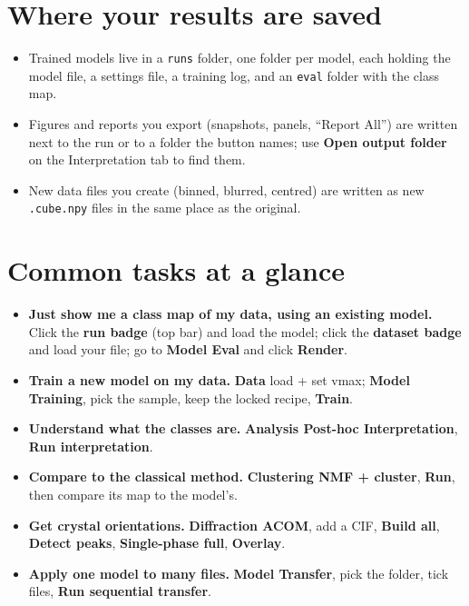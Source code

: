 \documentclass[11pt]{article}
\newcommand{\btn}[1]{\textbf{#1}}
\newcommand{\tab}[1]{\textsf{\textbf{#1}}}
\begin{document}
\section{Where your results are saved}
\begin{itemize}[itemsep=2pt]
\item Trained models live in a \texttt{runs} folder, one folder per model, each
holding the model file, a settings file, a training log, and an \texttt{eval}
folder with the class map.
\item Figures and reports you export (snapshots, panels, ``Report All'') are
written next to the run or to a folder the button names; use \btn{Open output
folder} on the Interpretation tab to find them.
\item New data files you create (binned, blurred, centred) are written as new
\texttt{.cube.npy} files in the same place as the original.
\end{itemize}

\section{Common tasks at a glance}
\begin{itemize}[itemsep=4pt]
\item \textbf{Just show me a class map of my data, using an existing model.}
Click the \textbf{run badge} (top bar) and load the model; click the
\textbf{dataset badge} and load your file; go to \tab{Model \textrightarrow{} Eval}
and click \btn{Render}.
\item \textbf{Train a new model on my data.}
\tab{Data} load + set vmax; \tab{Model \textrightarrow{} Training}, pick the sample,
keep the locked recipe, \btn{Train}.
\item \textbf{Understand what the classes are.}
\tab{Analysis \textrightarrow{} Post-hoc \textrightarrow{} Interpretation},
\btn{Run interpretation}.
\item \textbf{Compare to the classical method.}
\tab{Clustering \textrightarrow{} NMF + cluster}, \btn{Run}, then compare its map to
the model's.
\item \textbf{Get crystal orientations.}
\tab{Diffraction \textrightarrow{} ACOM}, add a CIF, \btn{Build all},
\btn{Detect peaks}, \btn{Single-phase full}, \btn{Overlay}.
\item \textbf{Apply one model to many files.}
\tab{Model \textrightarrow{} Transfer}, pick the folder, tick files,
\btn{Run sequential transfer}.
\end{itemize}
\end{document}
